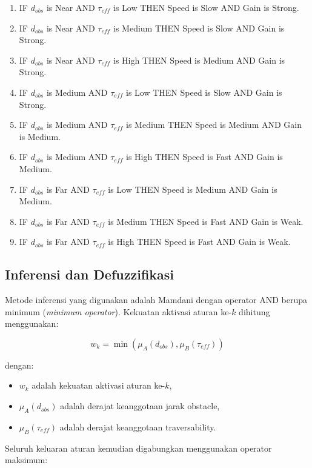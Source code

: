 \begin{enumerate}
\item IF $d_{obs}$ is Near AND $\tau_{eff}$ is Low THEN Speed is Slow AND Gain is Strong.
\item IF $d_{obs}$ is Near AND $\tau_{eff}$ is Medium THEN Speed is Slow AND Gain is Strong.
\item IF $d_{obs}$ is Near AND $\tau_{eff}$ is High THEN Speed is Medium AND Gain is Strong.
\item IF $d_{obs}$ is Medium AND $\tau_{eff}$ is Low THEN Speed is Slow AND Gain is Strong.
\item IF $d_{obs}$ is Medium AND $\tau_{eff}$ is Medium THEN Speed is Medium AND Gain is Medium.
\item IF $d_{obs}$ is Medium AND $\tau_{eff}$ is High THEN Speed is Fast AND Gain is Medium.
\item IF $d_{obs}$ is Far AND $\tau_{eff}$ is Low THEN Speed is Medium AND Gain is Medium.
\item IF $d_{obs}$ is Far AND $\tau_{eff}$ is Medium THEN Speed is Fast AND Gain is Weak.
\item IF $d_{obs}$ is Far AND $\tau_{eff}$ is High THEN Speed is Fast AND Gain is Weak.
\end{enumerate}

\subsection{Inferensi dan Defuzzifikasi}

Metode inferensi yang digunakan adalah Mamdani dengan operator AND berupa minimum (\textit{minimum operator}). Kekuatan aktivasi aturan ke-$k$ dihitung menggunakan:

\begin{equation}
w_k
=
\min
\left(
\mu_A(d_{obs}),
\mu_B(\tau_{eff})
\right)
\label{eq:fuzzy_rule_strength}
\end{equation}

dengan:

\begin{itemize}
\item $w_k$ adalah kekuatan aktivasi aturan ke-$k$,
\item $\mu_A(d_{obs})$ adalah derajat keanggotaan jarak obstacle,
\item $\mu_B(\tau_{eff})$ adalah derajat keanggotaan traversability.
\end{itemize}

Seluruh keluaran aturan kemudian digabungkan menggunakan operator maksimum:

